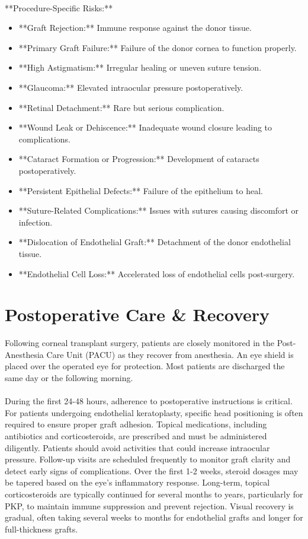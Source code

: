 \paragraph{}
**Procedure-Specific Risks:**
\begin{itemize}
  \item **Graft Rejection:** Immune response against the donor tissue.
  \item **Primary Graft Failure:** Failure of the donor cornea to function properly.
  \item **High Astigmatism:** Irregular healing or uneven suture tension.
  \item **Glaucoma:** Elevated intraocular pressure postoperatively.
  \item **Retinal Detachment:** Rare but serious complication.
  \item **Wound Leak or Dehiscence:** Inadequate wound closure leading to complications.
  \item **Cataract Formation or Progression:** Development of cataracts postoperatively.
  \item **Persistent Epithelial Defects:** Failure of the epithelium to heal.
  \item **Suture-Related Complications:** Issues with sutures causing discomfort or infection.
  \item **Dislocation of Endothelial Graft:** Detachment of the donor endothelial tissue.
  \item **Endothelial Cell Loss:** Accelerated loss of endothelial cells post-surgery.
\end{itemize}

\section*{Postoperative Care \& Recovery}
Following corneal transplant surgery, patients are closely monitored in the Post-Anesthesia Care Unit (PACU) as they recover from anesthesia. An eye shield is placed over the operated eye for protection. Most patients are discharged the same day or the following morning.

\paragraph{}
During the first 24-48 hours, adherence to postoperative instructions is critical. For patients undergoing endothelial keratoplasty, specific head positioning is often required to ensure proper graft adhesion. Topical medications, including antibiotics and corticosteroids, are prescribed and must be administered diligently. Patients should avoid activities that could increase intraocular pressure. Follow-up visits are scheduled frequently to monitor graft clarity and detect early signs of complications. Over the first 1-2 weeks, steroid dosages may be tapered based on the eye's inflammatory response. Long-term, topical corticosteroids are typically continued for several months to years, particularly for PKP, to maintain immune suppression and prevent rejection. Visual recovery is gradual, often taking several weeks to months for endothelial grafts and longer for full-thickness grafts.

